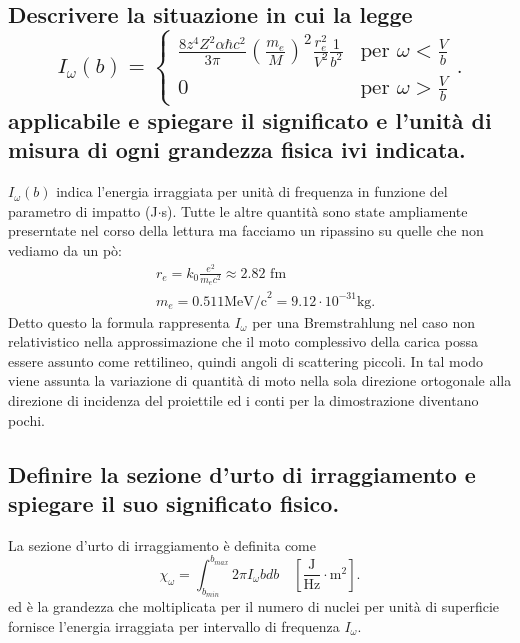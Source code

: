 \subsection[]{Descrivere la situazione in cui la legge
\[
	I_{\omega}\left( b \right) = 
	\begin{cases}
		\frac{8z^4Z^2 \alpha \hbar c^2}{3\pi} \left( \frac{m_e}{M} \right) ^2 \frac{r^2_e}{V^2} \frac{1}{b ^2}  & \text{per } \omega<\frac{V}{b}\\
		0 & \text{per } \omega> \frac{V}{b}
	\end{cases}
.\] 
applicabile e spiegare il significato e l'unità di misura di ogni grandezza fisica ivi indicata.
}\label{sec:4.a.12}
$I_{\omega}\left( b \right) $ indica l'energia irraggiata per unità di frequenza in funzione del parametro di impatto (J$\cdot$s). Tutte le altre quantità sono state ampliamente preserntate nel corso della lettura ma facciamo un ripassino su quelle che non vediamo da un pò:
\begin{align*}
	&r_e = k_0 \frac{e^2}{m_e c^2} \approx 2.82 \text{ fm}\\
	&m_e = 0.511 \text{MeV/c}^2 = 9.12 \cdot 10^{-31} \text{kg}
.\end{align*}
Detto questo la formula rappresenta $I_{\omega}$ per una Bremstrahlung nel caso non relativistico nella approssimazione che il moto complessivo della carica possa essere assunto come rettilineo, quindi angoli di scattering piccoli. In tal modo viene assunta la variazione di quantità di moto nella sola direzione ortogonale alla direzione di incidenza del proiettile ed i conti per la dimostrazione diventano pochi.

\subsection[]{Definire la sezione d'urto di irraggiamento e spiegare il suo significato fisico.
}\label{sec:4.a.13}
La sezione d'urto di irraggiamento è definita come
\[
	\chi_{\omega}= \int_{b_{min}}^{b_{max}} 2\pi I_{\omega}b db \quad \left[ \frac{\text{J}}{\text{Hz}}\cdot \text{m}^2 \right] 
.\] 
ed è la grandezza che moltiplicata per il numero di nuclei per unità di superficie fornisce l'energia irraggiata per intervallo di frequenza $I_{\omega}$.

